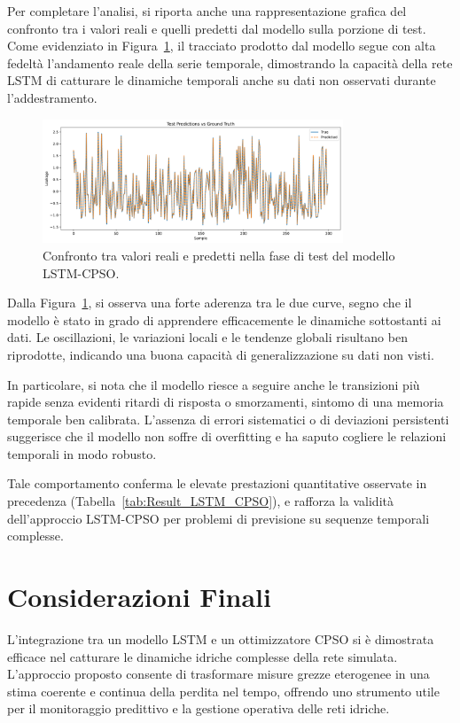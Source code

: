 \documentclass{article}
\begin{document}
Per completare l’analisi, si riporta anche una rappresentazione grafica del confronto tra i valori 
reali e quelli predetti dal modello sulla porzione di test. Come evidenziato in Figura~\ref{fig:test_predict}, 
il tracciato prodotto dal modello segue con alta fedeltà l’andamento reale della serie temporale, 
dimostrando la capacità della rete LSTM di catturare le dinamiche temporali anche su dati non osservati 
durante l’addestramento.

\begin{figure}[H]
    \centering
    \includegraphics[width=0.8\textwidth]{img/Test Predict.png}
    \caption{Confronto tra valori reali e predetti nella fase di test del modello LSTM-CPSO.}
    \label{fig:test_predict}
\end{figure}

Dalla Figura~\ref{fig:test_predict}, si osserva una forte aderenza tra le due curve, segno che il 
modello è stato in grado di apprendere efficacemente le dinamiche sottostanti ai dati. Le oscillazioni, 
le variazioni locali e le tendenze globali risultano ben riprodotte, indicando una buona capacità di 
generalizzazione su dati non visti.

In particolare, si nota che il modello riesce a seguire anche le transizioni più rapide senza evidenti 
ritardi di risposta o smorzamenti, sintomo di una memoria temporale ben calibrata. L’assenza di errori 
sistematici o di deviazioni persistenti suggerisce che il modello non soffre di overfitting e ha saputo 
cogliere le relazioni temporali in modo robusto.

Tale comportamento conferma le elevate prestazioni quantitative osservate in precedenza 
(Tabella~\ref{tab:Result_LSTM_CPSO}), e rafforza la validità dell’approccio LSTM-CPSO per problemi di 
previsione su sequenze temporali complesse.

\section{Considerazioni Finali}

L’integrazione tra un modello LSTM e un ottimizzatore CPSO si è dimostrata efficace nel catturare le 
dinamiche idriche complesse della rete simulata. L’approccio proposto consente di trasformare misure 
grezze eterogenee in una stima coerente e continua della perdita nel tempo, offrendo uno strumento utile 
per il monitoraggio predittivo e la gestione operativa delle reti idriche.
\end{document}
